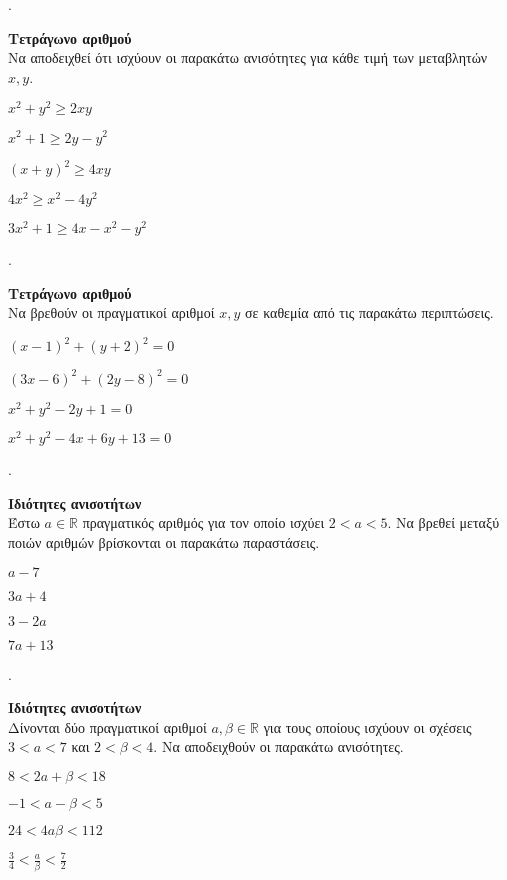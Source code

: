 \documentclass[11pt,a4paper,twocolumn]{article}
\newcounter{askhsh}
\newcommand{\askhsh}{\large\theaskhsh.\ \addtocounter{askhsh}{1}}
\begin{document}
\askhsh \textbf{Τετράγωνο αριθμού}\\
Να αποδειχθεί ότι ισχύουν οι παρακάτω ανισότητες για κάθε τιμή των μεταβλητών $ x,y $.
\begin{multicols}{2}
\begin{rlist}
\item $ x^2+y^2\geq 2xy $
\item $ x^2+1\geq 2y-y^2 $
\item $ (x+y)^2\geq 4xy $
\item $ 4x^2\geq x^2-4y^2 $
\end{rlist}
\end{multicols}
\vspace{-8mm}
\begin{rlist}[start=5]
\item $ 3x^2+1\geq 4x-x^2-y^2 $
\end{rlist}
\askhsh \textbf{Τετράγωνο αριθμού}\\
Να βρεθούν οι πραγματικοί αριθμοί $ x,y $ σε καθεμία από τις παρακάτω περιπτώσεις.
\begin{rlist}
\item $ (x-1)^2+(y+2)^2=0 $
\item $ (3x-6)^2+(2y-8)^2=0 $
\item $ x^2+y^2-2y+1=0 $
\item $ x^2+y^2-4x+6y+13=0 $
\end{rlist}
\askhsh \textbf{Ιδιότητες ανισοτήτων}\\
Έστω $ a\in\mathbb{R} $ πραγματικός αριθμός για τον οποίο ισχύει $ 2<a<5 $. Να βρεθεί μεταξύ ποιών αριθμών βρίσκονται οι παρακάτω παραστάσεις.
\begin{multicols}{2}
\begin{rlist}
\item $ a-7 $
\item $ 3a+4 $
\item $ 3-2a $
\item $ 7a+13 $
\end{rlist}
\end{multicols}
\askhsh \textbf{Ιδιότητες ανισοτήτων}\\
Δίνονται δύο πραγματικοί αριθμοί $ a,\beta\in\mathbb{R} $ για τους οποίους ισχύουν οι σχέσεις $ 3<a<7 $ και $ 2<\beta<4 $. Να αποδειχθούν οι παρακάτω ανισότητες.
\begin{multicols}{2}
\begin{rlist}
\item $ 8<2a+\beta<18 $
\item $ -1<a-\beta<5 $
\item $ 24<4a\beta<112 $
\item $ \frac{3}{4}<\frac{a}{\beta}<\frac{7}{2} $
\end{rlist}
\end{multicols}
\end{document}
